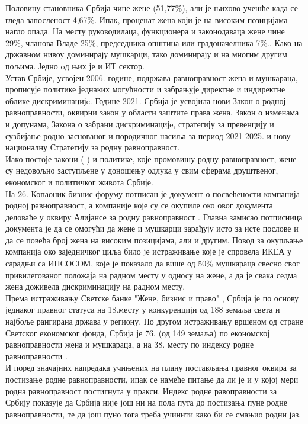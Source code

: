 \documentclass[a4paper]{article}
\begin{document}
Половину становника Србија чине жене (51,77\%), али је њихово учешће када се гледа запосленост 
4,67\%. Ипак, проценат жена који је на високим позицијама нагло опада. На месту руководилаца, 
функционера и законодаваца жене чине 29\%, чланова Владе 25\%, председника општина или 
градоначелника 7\%.. \cite{stat} Како на државном нивоу доминирају мушкарци, тако доминирају и на многим 
другим пољима. Једно oд њих је и ИТ сектор.\\
Устав Србије, усвојен 2006. године, подржава равноправност жена и мушкараца, прописује политике 
једнаких могућности и  забрањује директне и индиректне облике дискриминацијe. Године 2021. Србија 
је усвојила нови Закон о родној равноправности, оквирни закон у области заштите права жена, Закон 
о изменама и допунама, Закона о забрани дискриминацијe, стратегију за превенцију и сузбијање родно
заснованог и породичног насиља за период 2021-2025. и нову националну Стратегију за родну 
равноправност.\\
Иако постоје закони ( \cite{zakon1} ) и политике, које промовишу родну равноправност, жене су недовољно 
заступљене у доношењу одлука у свим сферама друштвеног, економског и политичког 
живота Србије. \\ 
На 26. Копаоник бизнис форуму потписан је документ о посвећености компанија  родној равноправност,
а компаније које су се окупиле око овог документа деловаће у оквиру Алијансе за родну 
равноправност \cite{alijansa}. Главна замисао потписница документа је да се омогући да жене и мушкарци зарађују 
исто за исте послове и да се повећа број жена на високим позицијама, али и другим. Повод за 
окупљање компанија око заједничког циља било је истраживање које је спровела ИКЕА у сарадњи са 
ИПСОСОМ, које је показало да више од 50\% мушкараца свесно свог привилегованог положаја 
на радном месту у односу на жене, а да је свака седма жена доживела дискриминацију 
на радном месту.\\
Према истраживању Светске банке "Жене, бизнис и право" \cite{banka}, Србија је по основу једнаког правног 
статуса на 18.месту у конкуренцији од 188 земаља света и најбоље рангирана држава у региону. По 
другом истраживању вршеном од стране Светског економског фонда, Србија је 76. (од 149 земаља) по 
економској равноправности жена и мушкараца, а на 38. месту по индексу родне равноправности \cite{danas}.\\
И поред значајних напредака учињених на плану постављања правног оквира за постизање родне 
равноправности, ипак се намеће питање да ли је и у којој мери родна равноправност постигнута у 
пракси. Индекс родне равоправности за Србију показује да Србија није још ни на пола пута до 
постизања пуне родне равноправности, те да још пуно тога треба учинити како би се смањио 
родни јаз.  
\end{document}
